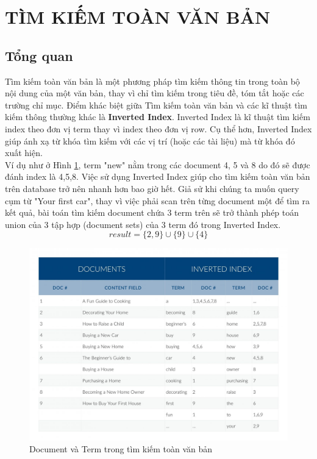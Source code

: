 \section{TÌM KIẾM TOÀN VĂN BẢN}
\subsection{Tổng quan}
\hspace*{1cm}Tìm kiếm toàn văn bản là một phương pháp tìm kiếm thông tin trong toàn bộ nội dung của một văn bản, thay vì chỉ tìm kiếm trong tiêu đề, tóm tắt hoặc các trường chỉ mục. Điểm khác biệt giữa Tìm kiếm toàn văn bản và các kĩ thuật tìm kiếm thông thường khác là \textbf{Inverted Index}. Inverted Index là kĩ thuật tìm kiếm index theo đơn vị term thay vì index theo đơn vị row. Cụ thể hơn, Inverted Index giúp ánh xạ từ khóa tìm kiếm với các vị trí (hoặc các tài liệu) mà từ khóa đó xuất hiện. \\
Ví dụ như ở Hình \ref{fig:ftsexample}, term "new" nằm trong các document 4, 5 và 8 do đó sẽ được đánh index là 4,5,8. Việc sử dụng Inverted Index giúp cho tìm kiếm toàn văn bản trên database trở nên nhanh hơn bao giờ hết. Giả sử khi chúng ta muốn query cụm từ "Your first car", thay vì việc phải scan trên từng document một để tìm ra kết quả, bài toán tìm kiếm document chứa 3 term trên sẽ trở thành phép toán union của 3 tập hợp (document sets) của 3 term đó trong Inverted Index.\\
        \[
result = \{2,9\} \cup \{9\} \cup \{4\}
\]
\begin{figure}[H]
    \centering
    \includegraphics[width=1\textwidth]{Images/HybridSearch/FullTextSearch.png}
    \caption{Document và Term trong tìm kiếm toàn văn bản}
    \label{fig:ftsexample}
\end{figure}


